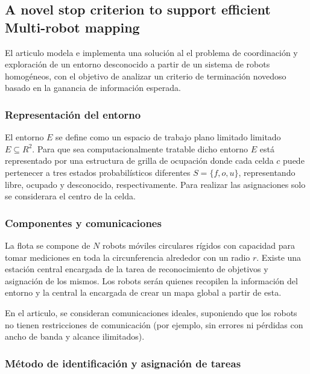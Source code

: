 \subsection{A novel stop criterion to support efficient Multi-robot mapping}\cite{amorin2019novel}
El articulo modela e implementa una solución al el problema de coordinación y exploración de un entorno desconocido a partir de un sistema de robots homogéneos, con el objetivo de analizar un criterio de terminación novedoso basado en la ganancia de información esperada.


\subsubsection{Representación del entorno}
El entorno $E$ se define como un espacio de trabajo plano limitado limitado $E\subseteq R^2$. Para que sea computacionalmente tratable dicho entorno $E$ está representado por una estructura de grilla de ocupación donde cada celda $c$ puede pertenecer a tres estados probabilísticos diferentes $S = \{f, o, u\}$, representando libre, ocupado y desconocido, respectivamente. Para realizar las asignaciones solo se considerara el centro de la celda.

\subsubsection{Componentes y comunicaciones}
La flota se compone de $N$ robots móviles circulares rígidos con capacidad para tomar mediciones en toda la circunferencia alrededor con un radio $r$. Existe una estación central encargada de la tarea de reconocimiento de objetivos y asignación de los mismos. Los robots serán quienes recopilen la información del entorno y la central la encargada de crear un mapa global a partir de esta. 

En el articulo, se consideran comunicaciones ideales, suponiendo que los robots no tienen restricciones de comunicación (por ejemplo, sin errores ni pérdidas con ancho de banda y alcance ilimitados). %

\subsubsection{Método de identificación y asignación de tareas}

